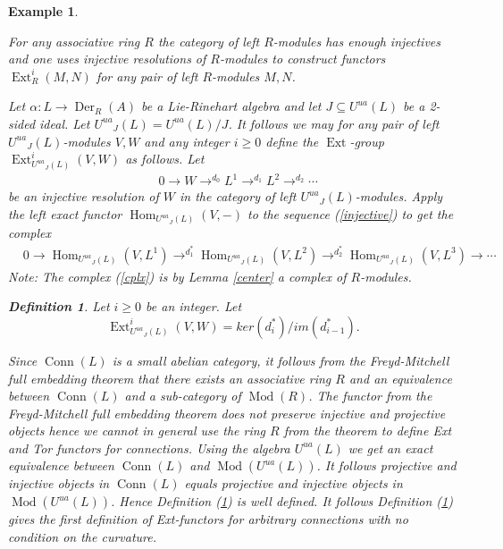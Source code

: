 \documentclass{amsart}
\theoremstyle{plain}
\newtheorem{example}[theorem]{Example}
\theoremstyle{definition}
\newtheorem{definition}[theorem]{Definition}
\theoremstyle{remark}
\numberwithin{equation}{theorem}
\begin{document}
\begin{example} \label{cohomology} 

For any associative ring $R$ the category of left $R$-modules has enough injectives and one uses injective
resolutions of $R$-modules to construct functors ${\operatorname{Ext} }^i_R(M,N)$ for any pair of left $R$-modules $M,N$.

Let $\alpha:L\rightarrow {\operatorname{Der} }_{R}({A})$ be a Lie-Rinehart algebra and 
let $J\subseteq {U^{ua}}(L)$ be a 2-sided ideal. Let ${U^{ua}}_J(L)={U^{ua}}(L)/J$.
It follows we may for any pair of left ${U^{ua}}_J(L)$-modules $V,W$ and any integer $i\geq 0$ define 
the ${\operatorname{Ext} }$-group ${\operatorname{Ext} }^i_{{U^{ua}}_J(L)}(V,W)$ as follows. Let 
\begin{align}
&\label{injective} 0\rightarrow W \rightarrow^{d_0} L^1 \rightarrow^{d_1} L^2 \rightarrow^{d_2} \cdots 
\end{align}
be an injective resolution of $W$ in the category of left ${U^{ua}}_J(L)$-modules. Apply the left exact functor ${\operatorname{Hom} }_{{U^{ua}}_J(L)}(V,-)$
to the sequence (\ref{injective}) to get the complex 
\begin{align}
&\label{cplx}0 \rightarrow {\operatorname{Hom} }_{{U^{ua}}_J(L)}(V,L^1)\rightarrow^{d_1^*} {\operatorname{Hom} }_{{U^{ua}}_J(L)}(V,L^2) \rightarrow^{d_2^*}  
{\operatorname{Hom} }_{{U^{ua}}_J(L)}(V,L^3) \rightarrow \cdots 
\end{align}
Note: The complex (\ref{cplx}) is by Lemma \ref{center} a complex of ${R}$-modules.
\begin{definition} \label{extfunctor} Let $i\geq 0$ be an integer. Let
\[ {\operatorname{Ext} }^i_{{U^{ua}}_J(L)}(V,W)=ker(d_i^*)/im(d_{i-1}^*).\]
\end{definition}

Since ${\operatorname{Conn}}(L)$ is a small abelian category, it follows from the 
Freyd-Mitchell full embedding theorem that there exists an associative  ring $R$ and an equivalence
between ${\operatorname{Conn}}(L)$ and a sub-category of ${\operatorname{Mod}}(R)$. 
The functor from the Freyd-Mitchell full embedding theorem does not preserve injective and projective objects hence 
we cannot in general use the ring $R$ from the theorem to define Ext and Tor functors for connections. 
Using the algebra ${U^{ua}}(L)$ we get an exact equivalence between
${\operatorname{Conn}}(L)$ and ${\operatorname{Mod}}({U^{ua}}(L))$. It follows projective and injective objects in ${\operatorname{Conn}}(L)$ equals projective and injective
objects in ${\operatorname{Mod}}({U^{ua}}(L))$. Hence Definition (\ref{extfunctor}) is well defined.
It follows Definition (\ref{extfunctor}) gives the first definition of Ext-functors for 
arbitrary connections with no condition on the curvature.
\end{example}
\end{document}
